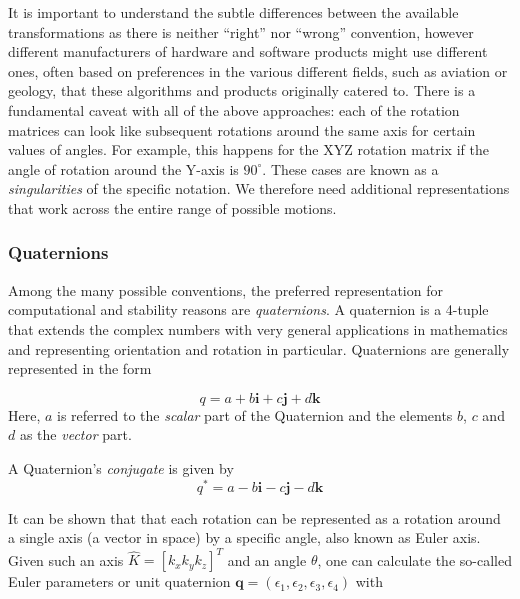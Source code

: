 It is important to understand the subtle differences between the available transformations as there is neither ``right'' nor ``wrong'' convention, however different manufacturers of hardware and software products might use different ones, often based on preferences in the various different fields, such as aviation or geology, that these algorithms and products originally catered to.
There is a fundamental caveat with all of the above approaches: each of the rotation matrices can look like subsequent rotations around the same axis for certain values of angles. For example, this happens for the XYZ rotation matrix if the angle of rotation around the Y-axis is $90^\circ$. These cases are known as a \textsl{singularities} of the specific notation. We therefore need additional representations that work across the entire range of possible motions. 

\subsubsection{Quaternions}

Among the many possible conventions, the preferred representation for computational and stability reasons are \textsl{quaternions}.
A quaternion is a 4-tuple that extends the complex numbers with very general applications in mathematics and representing orientation and rotation in particular. Quaternions are generally represented in the form

\begin{equation}
q=a+b\mathbf{i}+c\mathbf{j}+d\mathbf{k}
\end{equation}
Here, $a$ is referred to the \emph{scalar} part of the Quaternion and the elements $b$, $c$ and $d$ as the \emph{vector} part. 

A Quaternion's \emph{conjugate} is given by
\begin{equation}
q^*=a-b\mathbf{i}-c\mathbf{j}-d\mathbf{k}
\end{equation}


It can be shown that that each rotation can be represented as a rotation around a single axis (a vector in space) by a specific angle, also known as Euler axis. Given such an axis $ \hat{K}=[k_x k_y k_z]^T$ and an angle $\theta$, one can calculate the so-called Euler parameters or unit quaternion $\textbf{q}=(\epsilon_1,\epsilon_2,\epsilon_3,\epsilon_4)$ with

